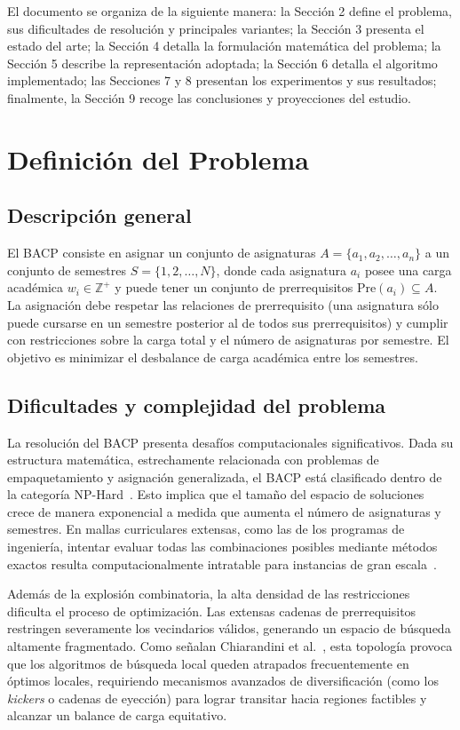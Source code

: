 \documentclass[letter, 10pt]{article}
\begin{document}
El documento se organiza de la siguiente manera: la Secci\'{o}n 2 define el problema, sus dificultades de resoluci\'{o}n y principales variantes; la Secci\'{o}n 3 presenta el estado del arte; la Secci\'{o}n 4 detalla la formulaci\'on matem\'atica del problema; la Secci\'on 5 describe la representaci\'on adoptada; la Secci\'on 6 detalla el algoritmo implementado; las Secciones 7 y 8 presentan los experimentos y sus resultados; finalmente, la Secci\'{o}n 9 recoge las conclusiones y proyecciones del estudio.


\section{Definici\'on del Problema}

\subsection{Descripci\'on general}
El BACP consiste en asignar un conjunto de asignaturas $A = \{a_1, a_2, \dots, a_n\}$ a un conjunto de semestres $S = \{1, 2, \dots, N\}$, donde cada asignatura $a_i$ posee una carga acad\'emica $w_i \in \mathbb{Z}^+$ y puede tener un conjunto de prerrequisitos $\text{Pre}(a_i) \subseteq A$. La asignaci\'on debe respetar las relaciones de prerrequisito (una asignatura s\'olo puede cursarse en un semestre posterior al de todos sus prerrequisitos) y cumplir con restricciones sobre la carga total y el n\'umero de asignaturas por semestre. El objetivo es minimizar el desbalance de carga acad\'emica entre los semestres.


\subsection{Dificultades y complejidad del problema}
La resoluci\'{o}n del BACP presenta desaf\'{i}os computacionales significativos. Dada su estructura matem\'{a}tica, estrechamente relacionada con problemas de empaquetamiento y asignaci\'{o}n generalizada, el BACP est\'{a} clasificado dentro de la categor\'{i}a NP-Hard~\cite{Castro2001}. Esto implica que el tama\~{n}o del espacio de soluciones crece de manera exponencial a medida que aumenta el n\'{u}mero de asignaturas y semestres. En mallas curriculares extensas, como las de los programas de ingenier\'{i}a, intentar evaluar todas las combinaciones posibles mediante m\'{e}todos exactos resulta computacionalmente intratable para instancias de gran escala~\cite{Chiarandini2012}. 

Adem\'{a}s de la explosi\'{o}n combinatoria, la alta densidad de las restricciones dificulta el proceso de optimizaci\'{o}n. Las extensas cadenas de prerrequisitos restringen severamente los vecindarios v\'{a}lidos, generando un espacio de b\'{u}squeda altamente fragmentado. Como se\~{n}alan Chiarandini et al.~\cite{Chiarandini2012}, esta topolog\'{i}a provoca que los algoritmos de b\'{u}squeda local queden atrapados frecuentemente en \'{o}ptimos locales, requiriendo mecanismos avanzados de diversificaci\'{o}n (como los \textit{kickers} o cadenas de eyecci\'{o}n) para lograr transitar hacia regiones factibles y alcanzar un balance de carga equitativo.
\end{document}

